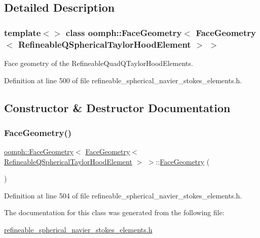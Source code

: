 \subsection{Detailed Description}
\subsubsection*{template$<$$>$\newline
class oomph\+::\+Face\+Geometry$<$ Face\+Geometry$<$ Refineable\+Q\+Spherical\+Taylor\+Hood\+Element $>$ $>$}

Face geometry of the Refineable\+Quad\+Q\+Taylor\+Hood\+Elements. 

Definition at line 500 of file refineable\+\_\+spherical\+\_\+navier\+\_\+stokes\+\_\+elements.\+h.



\subsection{Constructor \& Destructor Documentation}
\mbox{\label{classoomph_1_1FaceGeometry_3_01FaceGeometry_3_01RefineableQSphericalTaylorHoodElement_01_4_01_4_ae0fb9c43b6ae74a28c7bf34c08645ddc}} 
\subsubsection{\texorpdfstring{Face\+Geometry()}{FaceGeometry()}}
{\footnotesize\ttfamily \hyperlink{classoomph_1_1FaceGeometry}{oomph\+::\+Face\+Geometry}$<$ \hyperlink{classoomph_1_1FaceGeometry}{Face\+Geometry}$<$ \hyperlink{classoomph_1_1RefineableQSphericalTaylorHoodElement}{Refineable\+Q\+Spherical\+Taylor\+Hood\+Element} $>$ $>$\+::\hyperlink{classoomph_1_1FaceGeometry}{Face\+Geometry} (\begin{DoxyParamCaption}{ }\end{DoxyParamCaption})\hspace{0.3cm}{\ttfamily [inline]}}



Definition at line 504 of file refineable\+\_\+spherical\+\_\+navier\+\_\+stokes\+\_\+elements.\+h.



The documentation for this class was generated from the following file\+:\begin{DoxyCompactItemize}
\item 
\hyperlink{refineable__spherical__navier__stokes__elements_8h}{refineable\+\_\+spherical\+\_\+navier\+\_\+stokes\+\_\+elements.\+h}\end{DoxyCompactItemize}

